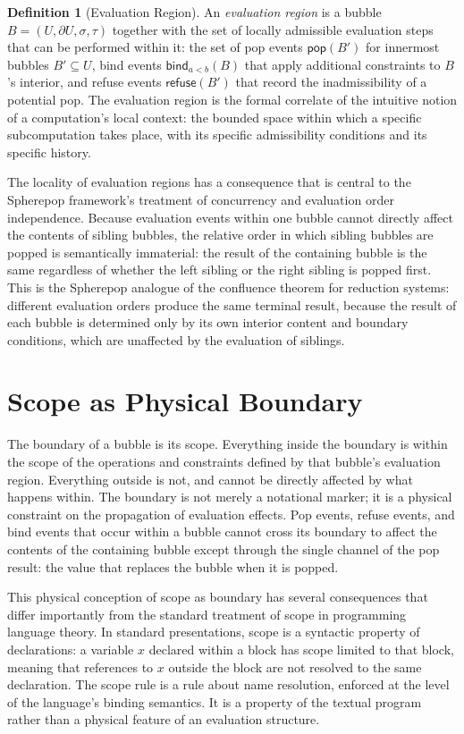 \documentclass[12pt,openany]{book}
\theoremstyle{plain}
\theoremstyle{definition}
\newtheorem{definition}[theorem]{Definition}
\theoremstyle{remark}
\newcommand{\spop}[1]{\mathsf{pop}\!\left(#1\right)}
\newcommand{\srefuse}[1]{\mathsf{refuse}\!\left(#1\right)}
\newcommand{\sbind}[2]{\mathsf{bind}_{#1}\!\left(#2\right)}
\begin{document}
\begin{definition}[Evaluation Region]
An \emph{evaluation region} is a bubble $B = (U, \partial U, \sigma, \tau)$ together with the set of locally admissible evaluation steps that can be performed within it: the set of pop events $\spop{B'}$ for innermost bubbles $B' \subseteq U$, bind events $\sbind{a<b}{B}$ that apply additional constraints to $B$'s interior, and refuse events $\srefuse{B'}$ that record the inadmissibility of a potential pop. The evaluation region is the formal correlate of the intuitive notion of a computation's local context: the bounded space within which a specific subcomputation takes place, with its specific admissibility conditions and its specific history.
\end{definition}

The locality of evaluation regions has a consequence that is central to the Spherepop framework's treatment of concurrency and evaluation order independence. Because evaluation events within one bubble cannot directly affect the contents of sibling bubbles, the relative order in which sibling bubbles are popped is semantically immaterial: the result of the containing bubble is the same regardless of whether the left sibling or the right sibling is popped first. This is the Spherepop analogue of the confluence theorem for reduction systems: different evaluation orders produce the same terminal result, because the result of each bubble is determined only by its own interior content and boundary conditions, which are unaffected by the evaluation of siblings.

\section{Scope as Physical Boundary}

The boundary of a bubble is its scope. Everything inside the boundary is within the scope of the operations and constraints defined by that bubble's evaluation region. Everything outside is not, and cannot be directly affected by what happens within. The boundary is not merely a notational marker; it is a physical constraint on the propagation of evaluation effects. Pop events, refuse events, and bind events that occur within a bubble cannot cross its boundary to affect the contents of the containing bubble except through the single channel of the pop result: the value that replaces the bubble when it is popped.

This physical conception of scope as boundary has several consequences that differ importantly from the standard treatment of scope in programming language theory. In standard presentations, scope is a syntactic property of declarations: a variable $x$ declared within a block has scope limited to that block, meaning that references to $x$ outside the block are not resolved to the same declaration. The scope rule is a rule about name resolution, enforced at the level of the language's binding semantics. It is a property of the textual program rather than a physical feature of an evaluation structure.
\end{document}
